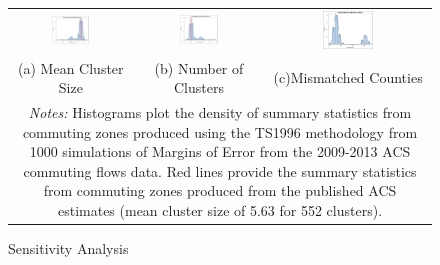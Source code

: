 
\begin{figure}[th]
\caption{Sensitivity Analysis}
\begin{tabular}{ccc}
\includegraphics[width=0.33\textwidth]{./figures/mean_clussize_jtw2009.png}
&
\includegraphics[width=0.33\textwidth]{./figures/numclusters_jtw2009.png}
&
\includegraphics[width=0.33\textwidth]{./figures/mismatchedcounties_jtw2009.png}
\\
{(a) Mean Cluster Size}&
{(b) Number of Clusters}&
{(c)Mismatched Counties}
\\
\multicolumn{3}{p{6.2in}}{\footnotesize \emph{Notes:} Histograms plot the density of summary statistics from commuting zones produced using the TS1996 methodology from 1000 simulations of Margins of Error from the 2009-2013 ACS commuting flows data. Red lines provide the summary statistics from commuting zones produced from the published ACS estimates (mean cluster size of 5.63 for 552 clusters).}\\
\end{tabular}
\label{fig:perturbation}
\end{figure}
\normalsize 

